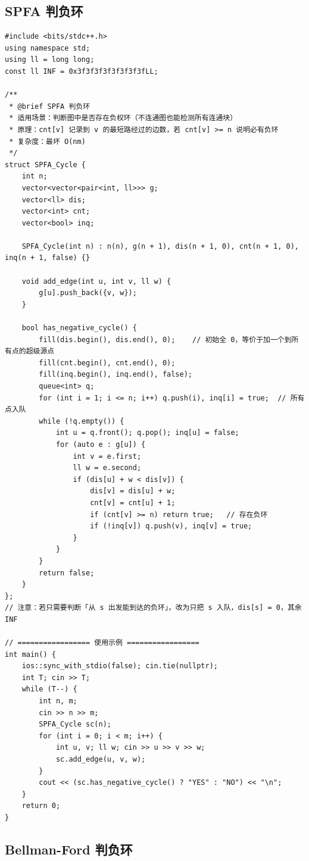 \subsection{SPFA 判负环}

\begin{lstlisting}
#include <bits/stdc++.h>
using namespace std;
using ll = long long;
const ll INF = 0x3f3f3f3f3f3f3f3fLL;

/**
 * @brief SPFA 判负环
 * 适用场景：判断图中是否存在负权环（不连通图也能检测所有连通块）
 * 原理：cnt[v] 记录到 v 的最短路经过的边数，若 cnt[v] >= n 说明必有负环
 * 复杂度：最坏 O(nm)
 */
struct SPFA_Cycle {
    int n;
    vector<vector<pair<int, ll>>> g;
    vector<ll> dis;
    vector<int> cnt;
    vector<bool> inq;

    SPFA_Cycle(int n) : n(n), g(n + 1), dis(n + 1, 0), cnt(n + 1, 0), inq(n + 1, false) {}

    void add_edge(int u, int v, ll w) {
        g[u].push_back({v, w});
    }

    bool has_negative_cycle() {
        fill(dis.begin(), dis.end(), 0);    // 初始全 0，等价于加一个到所有点的超级源点
        fill(cnt.begin(), cnt.end(), 0);
        fill(inq.begin(), inq.end(), false);
        queue<int> q;
        for (int i = 1; i <= n; i++) q.push(i), inq[i] = true;  // 所有点入队
        while (!q.empty()) {
            int u = q.front(); q.pop(); inq[u] = false;
            for (auto e : g[u]) {
                int v = e.first;
                ll w = e.second;
                if (dis[u] + w < dis[v]) {
                    dis[v] = dis[u] + w;
                    cnt[v] = cnt[u] + 1;
                    if (cnt[v] >= n) return true;   // 存在负环
                    if (!inq[v]) q.push(v), inq[v] = true;
                }
            }
        }
        return false;
    }
};
// 注意：若只需要判断「从 s 出发能到达的负环」，改为只把 s 入队，dis[s] = 0，其余 INF

// ================= 使用示例 =================
int main() {
    ios::sync_with_stdio(false); cin.tie(nullptr);
    int T; cin >> T;
    while (T--) {
        int n, m;
        cin >> n >> m;
        SPFA_Cycle sc(n);
        for (int i = 0; i < m; i++) {
            int u, v; ll w; cin >> u >> v >> w;
            sc.add_edge(u, v, w);
        }
        cout << (sc.has_negative_cycle() ? "YES" : "NO") << "\n";
    }
    return 0;
}
\end{lstlisting}

\subsection{Bellman-Ford 判负环}

